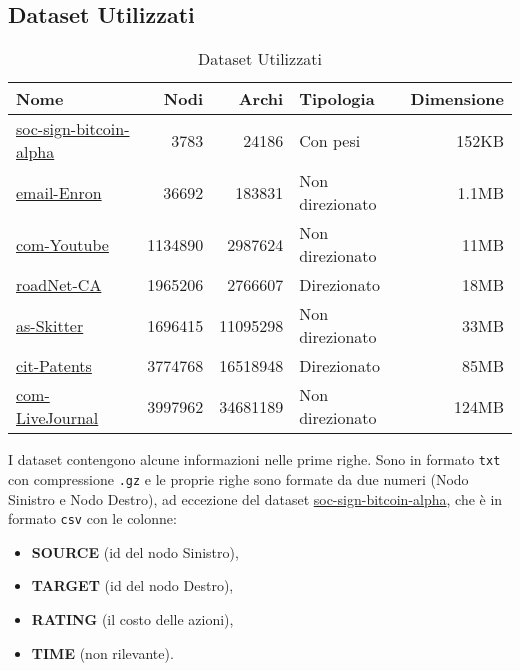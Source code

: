 \documentclass{ol-softwaremanual}
\begin{document}
\subsection{Dataset Utilizzati}
\begin{table}[h]
	\centering
	\begin{tabular}{|l|r|r|l|r|}
		\hline
		Nome                                                                                      & Nodi    & Archi    & Tipologia       & Dimensione \\
		\hline
		\href{https://snap.stanford.edu/data/soc-sign-bitcoin-alpha.html}{soc-sign-bitcoin-alpha} & 3783    & 24186    & Con pesi        & 152KB      \\
		\href{https://snap.stanford.edu/data/email-Enron.html}{email-Enron}                       & 36692   & 183831   & Non direzionato & 1.1MB      \\
		\href{https://snap.stanford.edu/data/com-Youtube.html}{com-Youtube}                       & 1134890 & 2987624  & Non direzionato & 11MB       \\
		\href{https://snap.stanford.edu/data/roadNet-CA.html}{roadNet-CA}                         & 1965206 & 2766607  & Direzionato     & 18MB       \\
		\href{https://snap.stanford.edu/data/as-Skitter.html}{as-Skitter}                         & 1696415 & 11095298 & Non direzionato & 33MB       \\
		\href{https://snap.stanford.edu/data/cit-Patents.html}{cit-Patents}                       & 3774768 & 16518948 & Direzionato     & 85MB       \\
		\href{https://snap.stanford.edu/data/com-LiveJournal.html}{com-LiveJournal}               & 3997962 & 34681189 & Non direzionato & 124MB      \\
		\hline
	\end{tabular}
	\caption{Dataset Utilizzati}
\end{table}

I dataset contengono alcune informazioni nelle prime righe. Sono in formato \texttt{txt}
con compressione \texttt{.gz} e le proprie righe sono formate da due numeri (Nodo Sinistro
e Nodo Destro), ad eccezione del dataset
\href{https://snap.stanford.edu/data/soc-sign-bitcoin-alpha.html}{soc-sign-bitcoin-alpha},
che è in formato \texttt{csv} con le colonne:
\begin{itemize}
	\item \textbf{SOURCE} (id del nodo Sinistro),
	\item \textbf{TARGET} (id del nodo Destro),
	\item \textbf{RATING} (il costo delle azioni),
	\item \textbf{TIME} (non rilevante).
\end{itemize}
\end{document}
